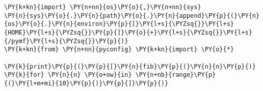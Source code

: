 \begin{Verbatim}[commandchars=\\\{\}]
\PY{k+kn}{import} \PY{n+nn}{os}\PY{o}{,}\PY{n+nn}{sys}
\PY{n}{sys}\PY{o}{.}\PY{n}{path}\PY{o}{.}\PY{n}{append}\PY{p}{(}\PY{n}{os}\PY{o}{.}\PY{n}{environ}\PY{p}{[}\PY{l+s}{\PYZsq{}}\PY{l+s}{HOME}\PY{l+s}{\PYZsq{}}\PY{p}{]}\PY{o}{+}\PY{l+s}{\PYZsq{}}\PY{l+s}{/pymf}\PY{l+s}{\PYZsq{}}\PY{p}{)}
\PY{k+kn}{from} \PY{n+nn}{pyconfig} \PY{k+kn}{import} \PY{o}{*}

\PY{k}{print}\PY{p}{(}\PY{p}{[}\PY{n}{fib}\PY{p}{(}\PY{n}{n}\PY{p}{)} \PY{k}{for} \PY{n}{n} \PY{o+ow}{in} \PY{n+nb}{range}\PY{p}{(}\PY{l+m+mi}{10}\PY{p}{)}\PY{p}{]}\PY{p}{)}
\end{Verbatim}
